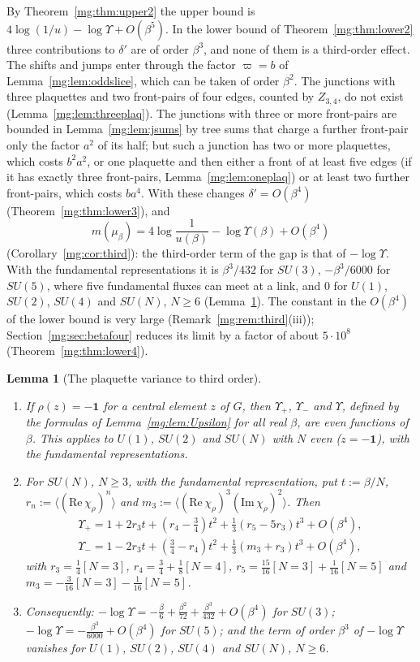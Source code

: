 \documentclass[11pt,a4paper]{article}
\newtheorem{lemma}[theorem]{Lemma}
\theoremstyle{definition}
\theoremstyle{remark}
\begin{document}
By Theorem~\ref{mg:thm:upper2} the upper bound is $4\log(1/u)-\log\Upsilon+O(\beta^5)$. In the lower bound of Theorem~\ref{mg:thm:lower2} three
contributions to $\delta'$ are of order $\beta^3$, and none of them is a third-order effect. The shifts and jumps enter through the factor $\varpi=b$
of Lemma~\ref{mg:lem:oddslice}, which can be taken of order $\beta^2$. The junctions with three plaquettes and two front-pairs of four edges, counted by
$Z_{3,4}$, do not exist (Lemma~\ref{mg:lem:threeplaq}). The junctions with three or more front-pairs are bounded in Lemma~\ref{mg:lem:jsums} by tree sums
that charge a further front-pair only the factor $a^2$ of its half; but such a junction has two or more plaquettes, which costs $b^2a^2$, or one plaquette
and then either a front of at least five edges (if it has exactly three front-pairs, Lemma~\ref{mg:lem:oneplaq}) or at least two further front-pairs,
which costs $ba^4$. With these changes $\delta'=O(\beta^4)$ (Theorem~\ref{mg:thm:lower3}), and
\[
m(\mu_\beta)=4\log\frac1{u(\beta)}-\log\Upsilon(\beta)+O(\beta^4)
\]
(Corollary~\ref{mg:cor:third}): the third-order term of the gap is that of $-\log\Upsilon$. With the fundamental representations it is $\beta^3/432$ for
$SU(3)$, $-\beta^3/6000$ for $SU(5)$, where five fundamental fluxes can meet at a link, and $0$ for $U(1)$, $SU(2)$, $SU(4)$ and $SU(N)$, $N\ge6$
(Lemma~\ref{mg:lem:Upsilon3}). The constant in the $O(\beta^4)$ of the lower bound is very large (Remark~\ref{mg:rem:third}(iii)); Section~\ref{mg:sec:betafour}
reduces its limit by a factor of about $5\cdot10^8$ (Theorem~\ref{mg:thm:lower4}).

\begin{lemma}[The plaquette variance to third order]\label{mg:lem:Upsilon3}
\begin{enumerate}[label=(\roman*)]
\item If $\rho(z)=-\mathbf1$ for a central element $z$ of $G$, then $\Upsilon_+$, $\Upsilon_-$ and $\Upsilon$, defined by the formulas of
Lemma~\ref{mg:lem:Upsilon} for all real $\beta$, are even functions of $\beta$. This applies to $U(1)$, $SU(2)$ and $SU(N)$ with $N$ even ($z=-\mathbf1$), with the
fundamental representations.
\item For $SU(N)$, $N\ge3$, with the fundamental representation, put $t:=\beta/N$, $r_n:=\langle(\mathrm{Re}\,\chi_\rho)^n\rangle$ and
$m_3:=\langle(\mathrm{Re}\,\chi_\rho)^3(\mathrm{Im}\,\chi_\rho)^2\rangle$. Then
\begin{gather*}
\Upsilon_+=1+2r_3t+(r_4-\tfrac34)t^2+\tfrac13(r_5-5r_3)t^3+O(\beta^4),\\
\Upsilon_-=1-2r_3t+(\tfrac34-r_4)t^2+\tfrac13(m_3+r_3)t^3+O(\beta^4),
\end{gather*}
with $r_3=\frac14[N=3]$, $r_4=\frac34+\frac18[N=4]$, $r_5=\frac{15}{16}[N=3]+\frac1{16}[N=5]$ and $m_3=-\frac3{16}[N=3]-\frac1{16}[N=5]$.
\item Consequently: $-\log\Upsilon=-\frac\beta6+\frac{\beta^2}{72}+\frac{\beta^3}{432}+O(\beta^4)$ for $SU(3)$; $-\log\Upsilon=-\frac{\beta^3}{6000}+O(\beta^4)$ for $SU(5)$; and
the term of order $\beta^3$ of $-\log\Upsilon$ vanishes for $U(1)$, $SU(2)$, $SU(4)$ and $SU(N)$, $N\ge6$.
\end{enumerate}
\end{lemma}
\end{document}
